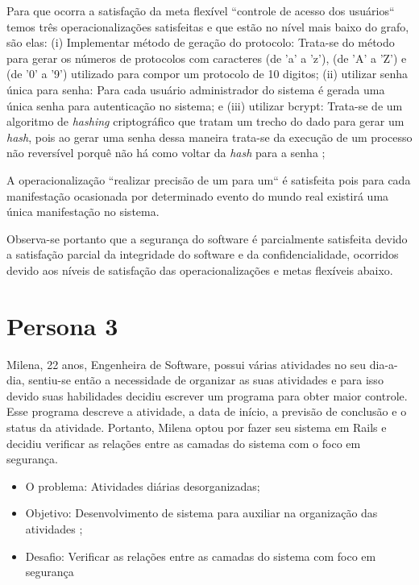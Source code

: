 Para que ocorra a satisfação da meta flexível ``controle de acesso dos usuários`` temos três operacionalizações satisfeitas e que estão no nível mais baixo do grafo, são elas: (i) Implementar método de geração do protocolo: Trata-se do método para gerar os números de protocolos com caracteres (de 'a' a 'z'), (de 'A' a 'Z') e (de '0' a '9') utilizado para compor um protocolo de 10 digitos; (ii) utilizar senha única para senha: Para cada usuário administrador do sistema é gerada uma única senha para autenticação no sistema; e (iii) utilizar bcrypt: Trata-se de um algoritmo de \textit{hashing} criptográfico que tratam um trecho do dado para gerar um \textit{hash}, pois ao gerar uma senha dessa maneira trata-se da execução de um processo não reversível porquê não há como voltar da \textit{hash} para a senha \cite{brcypt};

A operacionalização ``realizar precisão de um para um`` é satisfeita pois para cada manifestação ocasionada por determinado evento do mundo real existirá uma única manifestação no sistema.

Observa-se portanto que a segurança do software é parcialmente satisfeita devido a satisfação parcial da integridade do software e da confidencialidade, ocorridos devido aos níveis de satisfação das operacionalizações e metas flexíveis abaixo. 

\section{Persona 3}
\label{subsec:persona3}



Milena, 22 anos, Engenheira de Software, possui várias atividades no seu dia-a-dia, sentiu-se então a necessidade de organizar as suas atividades e para isso devido suas habilidades decidiu escrever um programa para obter maior controle. Esse programa descreve a atividade, a data de início, a previsão de conclusão e o status da atividade. Portanto, Milena optou por fazer seu sistema em Rails e decidiu verificar as relações entre as camadas do sistema com o foco em segurança.

\begin{itemize}
	\item O problema: Atividades diárias desorganizadas;
	\item Objetivo: Desenvolvimento de sistema para auxiliar na organização das atividades ;
	\item Desafio: Verificar as relações entre as camadas do sistema com foco em segurança
\end{itemize}

